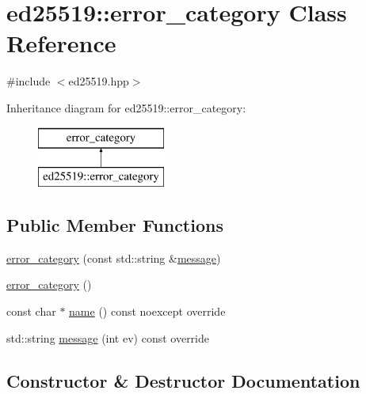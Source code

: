 \hypertarget{classed25519_1_1error__category}{}\section{ed25519\+:\+:error\+\_\+category Class Reference}
\label{classed25519_1_1error__category}


{\ttfamily \#include $<$ed25519.\+hpp$>$}

Inheritance diagram for ed25519\+:\+:error\+\_\+category\+:\begin{figure}[H]
\begin{center}
\leavevmode
\includegraphics[height=2.000000cm]{classed25519_1_1error__category}
\end{center}
\end{figure}
\subsection*{Public Member Functions}
\begin{DoxyCompactItemize}
\item 
\mbox{\hyperlink{classed25519_1_1error__category_a6150d658628877349385868102b0b9af}{error\+\_\+category}} (const std\+::string \&\mbox{\hyperlink{classed25519_1_1error__category_a202bf6ba84147b563f630c8f52c723ef}{message}})
\item 
\mbox{\hyperlink{classed25519_1_1error__category_a4fe3061ad89abff2d326dacbae9cee7d}{error\+\_\+category}} ()
\item 
const char $\ast$ \mbox{\hyperlink{classed25519_1_1error__category_a4bdacefbd1473eea02c945905230b6ce}{name}} () const noexcept override
\item 
std\+::string \mbox{\hyperlink{classed25519_1_1error__category_a202bf6ba84147b563f630c8f52c723ef}{message}} (int ev) const override
\end{DoxyCompactItemize}


\subsection{Constructor \& Destructor Documentation}
\mbox{\label{classed25519_1_1error__category_a6150d658628877349385868102b0b9af}} 

